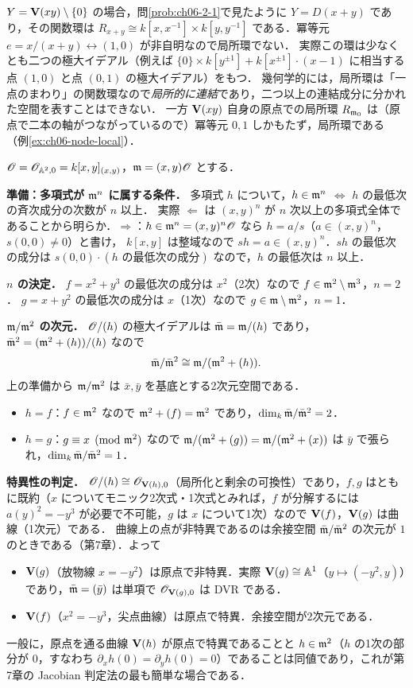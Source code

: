 $Y=\mathbf{V}(xy)\setminus\{0\}$ の場合，問\ref{prob:ch06-2-1}で見たように $Y=D(x+y)$ であり，その関数環は
$R_{x+y}\cong k[x,x^{-1}]\times k[y,y^{-1}]$ である．冪等元 $e=x/(x+y)\leftrightarrow(1,0)$ が非自明なので局所環でない．
実際この環は少なくとも二つの極大イデアル（例えば $\{0\}\times k[y^{\pm1}]+k[x^{\pm1}]\cdot(x-1)$ に相当する点 $(1,0)$ と点 $(0,1)$ の極大イデアル）をもつ．
幾何学的には，局所環は「一点のまわり」の関数環なので\emph{局所的に連結}であり，二つ以上の連結成分に分かれた空間を表すことはできない．
一方 $\mathbf{V}(xy)$ 自身の原点での局所環 $R_{\mathfrak{m}_0}$ は（原点で二本の軸がつながっているので）冪等元 $0,1$ しかもたず，局所環である（例\ref{ex:ch06-node-local}）．

$\mathscr{O}=\mathscr{O}_{\mathbb{A}^2,0}=k[x,y]_{(x,y)}$，$\mathfrak{m}=(x,y)\mathscr{O}$ とする．

\textbf{準備：多項式が $\mathfrak{m}^n$ に属する条件．}
多項式 $h$ について，$h\in\mathfrak{m}^n$ $\iff$ $h$ の最低次の斉次成分の次数が $n$ 以上．
実際 $\Leftarrow$ は $(x,y)^n$ が $n$ 次以上の多項式全体であることから明らか．$\Rightarrow$：$h\in\mathfrak{m}^n=(x,y)^n\mathscr{O}$ なら $h=a/s$（$a\in(x,y)^n$，$s(0,0)\ne0$）と書け，
$k[x,y]$ は整域なので $sh=a\in(x,y)^n$．$sh$ の最低次の成分は $s(0,0)\cdot(h\text{ の最低次の成分})$ なので，$h$ の最低次は $n$ 以上．

\textbf{$n$ の決定．}
$f=x^2+y^3$ の最低次の成分は $x^2$（2次）なので $f\in\mathfrak{m}^2\setminus\mathfrak{m}^3$，$n=2$．
$g=x+y^2$ の最低次の成分は $x$（1次）なので $g\in\mathfrak{m}\setminus\mathfrak{m}^2$，$n=1$．

\textbf{$\mathfrak{m}/\mathfrak{m}^2$ の次元．}
$\mathscr{O}/(h)$ の極大イデアルは $\bar{\mathfrak{m}}=\mathfrak{m}/(h)$ であり，$\bar{\mathfrak{m}}^2=(\mathfrak{m}^2+(h))/(h)$ なので
\[
  \bar{\mathfrak{m}}/\bar{\mathfrak{m}}^2\cong\mathfrak{m}/(\mathfrak{m}^2+(h)).
\]
上の準備から $\mathfrak{m}/\mathfrak{m}^2$ は $\bar x,\bar y$ を基底とする2次元空間である．
\begin{itemize}
  \item $h=f$：$f\in\mathfrak{m}^2$ なので $\mathfrak{m}^2+(f)=\mathfrak{m}^2$ であり，$\dim_k\bar{\mathfrak{m}}/\bar{\mathfrak{m}}^2=2$．
  \item $h=g$：$g\equiv x\pmod{\mathfrak{m}^2}$ なので $\mathfrak{m}/(\mathfrak{m}^2+(g))=\mathfrak{m}/(\mathfrak{m}^2+(x))$ は $\bar y$ で張られ，$\dim_k\bar{\mathfrak{m}}/\bar{\mathfrak{m}}^2=1$．
\end{itemize}

\textbf{特異性の判定．}
$\mathscr{O}/(h)\cong\mathscr{O}_{\mathbf{V}(h),0}$（局所化と剰余の可換性）であり，$f,g$ はともに既約（$x$ についてモニック2次式・1次式とみれば，$f$ が分解するには $a(y)^2=-y^3$ が必要で不可能，$g$ は $x$ について1次）なので $\mathbf{V}(f)$，$\mathbf{V}(g)$ は曲線（1次元）である．
曲線上の点が非特異であるのは余接空間 $\bar{\mathfrak{m}}/\bar{\mathfrak{m}}^2$ の次元が $1$ のときである（第7章）．よって
\begin{itemize}
  \item $\mathbf{V}(g)$（放物線 $x=-y^2$）は原点で非特異．実際 $\mathbf{V}(g)\cong\mathbb{A}^1$（$y\mapsto(-y^2,y)$）であり，$\bar{\mathfrak{m}}=(\bar y)$ は単項で $\mathscr{O}_{\mathbf{V}(g),0}$ は DVR である．
  \item $\mathbf{V}(f)$（$x^2=-y^3$，尖点曲線）は原点で特異．余接空間が2次元である．
\end{itemize}
一般に，原点を通る曲線 $\mathbf{V}(h)$ が原点で特異であることと $h\in\mathfrak{m}^2$（$h$ の1次の部分が $0$，すなわち $\partial_xh(0)=\partial_yh(0)=0$）であることは同値であり，これが第7章の Jacobian 判定法の最も簡単な場合である．

